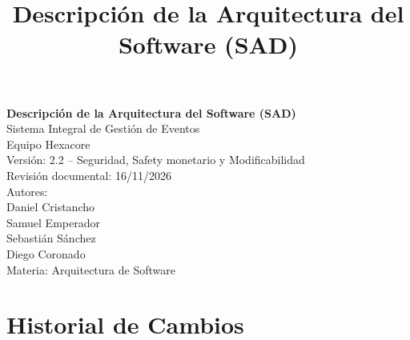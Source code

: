 \documentclass[11pt,a4paper]{article}
\title{\textbf{Descripción de la Arquitectura del Software (SAD)}}
\author{}
\date{}
\begin{document}
\begin{titlepage}
\centering
\vspace*{2cm}
{\LARGE \textbf{Descripción de la Arquitectura del Software (SAD)}}\\[0.4cm]
{\Large Sistema Integral de Gestión de Eventos}\\[1.5cm]
{\Large Equipo Hexacore}\\[2cm]
{\large Versión: 2.2 -- Seguridad, Safety monetario y Modificabilidad}\\[0.5cm]
{\large Revisión documental: 16/11/2026}\\[2cm]
{\large Autores:}\\
{\large Daniel Cristancho}\\
{\large Samuel Emperador}\\
{\large Sebastián Sánchez}\\
{\large Diego Coronado}\\
\vfill
{\small Materia: Arquitectura de Software}
\end{titlepage}

\section*{Historial de Cambios}
\end{document}
